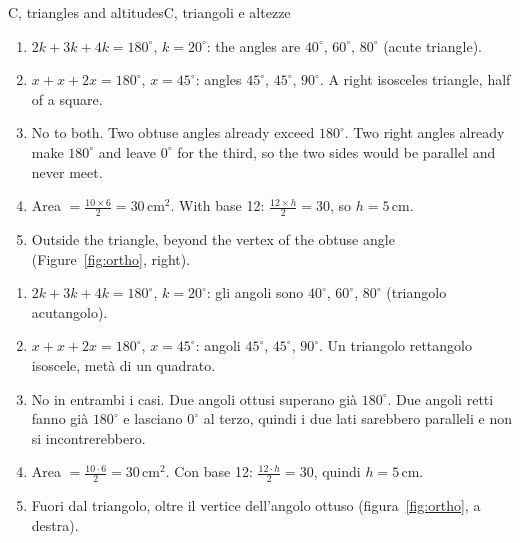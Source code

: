 \documentclass[10pt,a4paper,oneside]{book}
\begin{document}
\begin{solution}{C, triangles and altitudes}{C, triangoli e altezze}
\begin{enumerate}[label=\textbf{C\arabic*.}, leftmargin=2.2em]
\item $2k + 3k + 4k = 180^\circ$, $k = 20^\circ$: the angles are $40^\circ$, $60^\circ$, $80^\circ$ (acute triangle).
\item $x + x + 2x = 180^\circ$, $x = 45^\circ$: angles $45^\circ$, $45^\circ$, $90^\circ$. A right isosceles triangle, half of a square.
\item No to both. Two obtuse angles already exceed $180^\circ$. Two right angles already make $180^\circ$ and leave $0^\circ$ for the third, so the two sides would be parallel and never meet.
\item Area $= \frac{10 \times 6}{2} = 30\,\text{cm}^2$. With base 12: $\frac{12 \times h}{2} = 30$, so $h = 5$\,cm.
\item Outside the triangle, beyond the vertex of the obtuse angle (Figure~\ref{fig:ortho}, right).
\end{enumerate}
\tcblower
\begin{enumerate}[label=\textbf{C\arabic*.}, leftmargin=2.2em]
\item $2k + 3k + 4k = 180^\circ$, $k = 20^\circ$: gli angoli sono $40^\circ$, $60^\circ$, $80^\circ$ (triangolo acutangolo).
\item $x + x + 2x = 180^\circ$, $x = 45^\circ$: angoli $45^\circ$, $45^\circ$, $90^\circ$. Un triangolo rettangolo isoscele, metà di un quadrato.
\item No in entrambi i casi. Due angoli ottusi superano già $180^\circ$. Due angoli retti fanno già $180^\circ$ e lasciano $0^\circ$ al terzo, quindi i due lati sarebbero paralleli e non si incontrerebbero.
\item Area $= \frac{10 \cdot 6}{2} = 30\,\text{cm}^2$. Con base 12: $\frac{12 \cdot h}{2} = 30$, quindi $h = 5$\,cm.
\item Fuori dal triangolo, oltre il vertice dell'angolo ottuso (figura~\ref{fig:ortho}, a destra).
\end{enumerate}
\end{solution}
\end{document}
